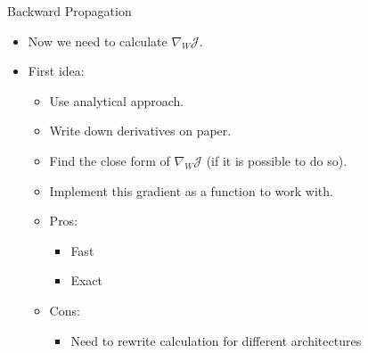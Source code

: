 \documentclass[compress,oilve,t]{beamer}
\begin{document}
\begin{frame}{Backward Propagation}
	\begin{itemize}
		\item Now we need to calculate $\nabla_W \mathcal{J}$.
		\medskip
		\item First idea:
		\begin{itemize}
			\item Use analytical approach.
			\item Write down derivatives on paper.
			\item Find the close form of $\nabla_W \mathcal{J}$ (if it is possible to do so).
			\item Implement this gradient as a function to work with.
			\medskip
			\medskip
			\item Pros:
			\begin{itemize}
				\item Fast
				\item Exact
			\end{itemize}
			\medskip
			\medskip
			\item Cons:
			\begin{itemize}
				\item Need to rewrite calculation for different architectures
			\end{itemize}
		\end{itemize}
	\end{itemize}
\end{frame}
\end{document}
